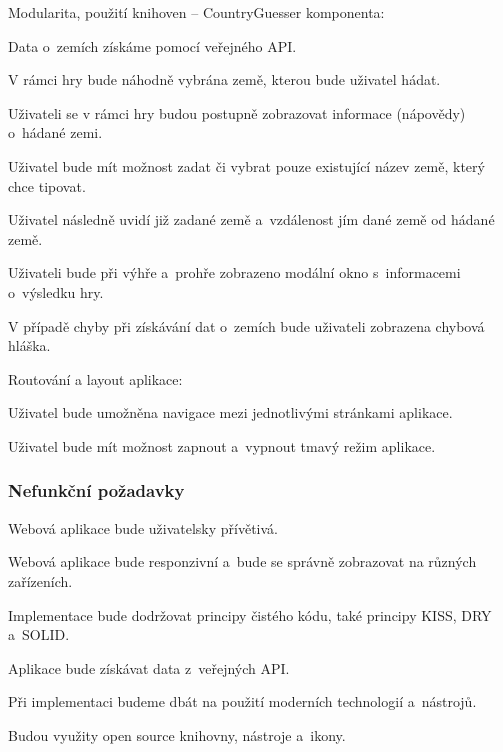 \begin{citemize}
	\item Modularita, použití knihoven -- CountryGuesser komponenta:
	
	\begin{cenumerate}
		\item Data o~zemích získáme pomocí veřejného API.
		\item V rámci hry bude náhodně vybrána země, kterou bude uživatel hádat.
		\item Uživateli se v rámci hry budou postupně zobrazovat informace (nápovědy) o~hádané zemi.
		\item Uživatel bude mít možnost zadat či vybrat pouze existující název země, který chce tipovat.
		\item Uživatel následně uvidí již zadané země a~vzdálenost jím dané země od hádané země.
		\item Uživateli bude při výhře a~prohře zobrazeno modální okno s~informacemi o~výsledku hry.
		\item V případě chyby při získávání dat o~zemích bude uživateli zobrazena chybová hláška.
	\end{cenumerate}

	\item Routování a layout aplikace:
	
	\begin{cenumerate}
		\item Uživatel bude umožněna navigace mezi jednotlivými stránkami aplikace.
		\item Uživatel bude mít možnost zapnout a~vypnout tmavý režim aplikace.
	\end{cenumerate}
\end{citemize}

\subsubsection{Nefunkční požadavky}

\begin{citemize}
	\item Webová aplikace bude uživatelsky přívětivá.
	\item Webová aplikace bude responzivní a~bude se správně zobrazovat na různých zařízeních.
	\item Implementace bude dodržovat principy čistého kódu, také principy KISS, DRY a~SOLID.
	\item Aplikace bude získávat data z~veřejných API.
	\item Při implementaci budeme dbát na použití moderních technologií a~nástrojů.
	\item Budou využity open source knihovny, nástroje a~ikony. 
\end{citemize}

